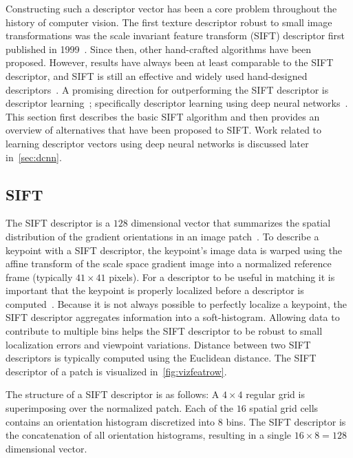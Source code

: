     Constructing such a descriptor vector has been a core problem throughout the history of computer vision.
    The first texture descriptor robust to small image transformations was the scale invariant feature
      transform (SIFT) descriptor first published in 1999~\cite{lowe_object_1999, lowe_distinctive_2004}.
    Since then, other hand-crafted algorithms have been proposed.
    However, results have always been at least comparable to the SIFT descriptor, and SIFT is still an effective
      and widely used hand-designed descriptors~\cite{mikolajczyk_performance_2005, calonder_brief_2010,
      bay_surf_2006, leutenegger_brisk_2011, alahi_freak_2012, jegou_triangulation_2014}.
    A promising direction for outperforming the SIFT descriptor is descriptor
      learning~\cite{simonyan_descriptor_2012, simonyan_learning_2014, winder_picking_2009}; specifically
      descriptor learning using deep neural networks~\cite{razavian_cnn_2014, bengio_representation_2013,
      russakovsky_imagenet_2015}.
    This section first describes the basic SIFT algorithm and then provides an overview of alternatives that have
      been proposed to SIFT{}.
    Work related to learning descriptor vectors using deep neural networks is discussed later in~\cref{sec:dcnn}.
      
    \subsection{SIFT}
        The {SIFT descriptor} is a $128$ dimensional vector that summarizes the spatial distribution of the
        gradient orientations in an image patch~\cite{lowe_distinctive_2004}. To describe a keypoint with a SIFT
        descriptor, the keypoint's image data is warped using the affine transform of the scale space gradient
        image into a normalized reference frame (typically $41 \times 41$ pixels). For a descriptor to be useful in
        matching it is important that the keypoint is properly localized before a descriptor is
        computed~\cite{ke_pca_sift_2004}. Because it is not always possible to perfectly localize a keypoint, the
        SIFT descriptor aggregates information into a soft-histogram. Allowing data to contribute to multiple bins
        helps the SIFT descriptor to be robust to small localization errors and viewpoint variations. Distance
        between two SIFT descriptors is typically computed using the Euclidean distance. The SIFT descriptor of a
        patch is visualized in~\cref{fig:vizfeatrow}.

        The structure of a SIFT descriptor is as follows: A $4\times4$ regular grid is superimposing over the
        normalized patch. Each of the $16$ spatial grid cells contains an orientation histogram discretized into
        $8$ bins. The SIFT descriptor is the concatenation of all orientation histograms, resulting in a single %
        $16 \times 8 = 128$ dimensional vector.

